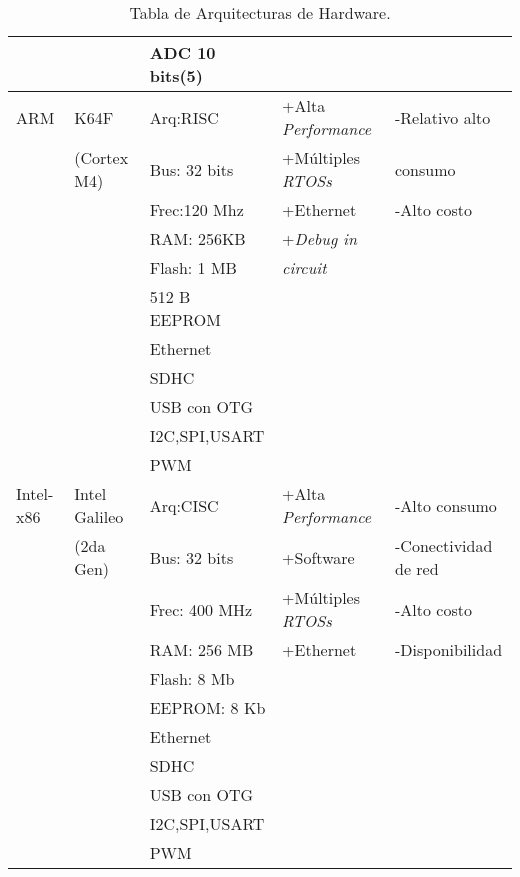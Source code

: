 \begin{table}[ht]
\begin{center}
\begin{tabular}{|l|l|l|l|l|}
    						&					& ADC 10 bits(5)			&				&		\\    		
    \hline
    ARM 					&K64F				& Arq:RISC					&+Alta \textit{Performance}		&-Relativo alto		\\
    						&(Cortex M4)		& Bus: 32 bits	 			&+Múltiples \textit{RTOSs}		& consumo		 	\\
    						&					& Frec:120 Mhz 				&+Ethernet						&-Alto costo		\\
    						&					& RAM: 256KB 				&+\textit{Debug in}				&					\\
							&					& Flash: 1 MB  				& \textit{circuit}				&					\\
							&					& 512 B EEPROM 				&				&			\\
    						&					& Ethernet					&				&		\\
    						&					& SDHC						&				&		\\
    					    &					& USB con OTG				&				&		\\
    						&					& I2C,SPI,USART				&				&		\\ 
    						&					& PWM						&				&		\\
    \hline
   Intel-x86  				&Intel Galileo 		& Arq:CISC					&+Alta \textit{Performance}		&-Alto consumo		\\
       						&(2da Gen)			& Bus: 32 bits				&+Software						&-Conectividad de red	 		\\
    						&					& Frec: 400 MHz				&+Múltiples \textit{RTOSs}		&-Alto costo	 	\\
    						&					& RAM: 256 MB				&+Ethernet						&-Disponibilidad		\\
							&					& Flash: 8 Mb 				&				&		\\
							&					& EEPROM: 8 Kb 				&				&		\\
    						&					& Ethernet			&				&		\\
    						&					& SDHC				&				&		\\
    					    &					& USB con OTG		&				&		\\
    						&					& I2C,SPI,USART		&				&		\\ 
    						&					& PWM				&				&		\\
    \hline
    
  \end{tabular}
  \hspace*{-2cm}
	\caption{Tabla de Arquitecturas de Hardware.}
	\label{Tabla de Arquitecturas de Hardware.}
	\end{center}
\end{table}
\clearpage


